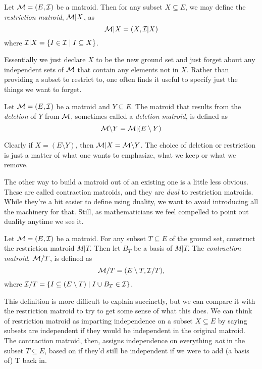 \documentclass[12pt,oneside]{../../sfsuthesis}
\begin{document}
\begin{definition}\th\label{def:restrictionMatroid}
    Let \( \mathcal{M} = (E, \mathcal{I}) \) be a matroid.
    Then for any subset \( X \subseteq E \), we may define the \emph{restriction matroid}, \( \mathcal{M}|X \), as
    \[
        \mathcal{M}|X = ( X, \mathcal{I}|X )
    \]
    where \( \mathcal{I}|X = \{I \in \mathcal{I} \; | \; I \subseteq X\} \).
\end{definition}

Essentially we just declare \( X \) to be the new ground set and just forget about any independent sets of \( \mathcal{M} \) that contain any elements not in \( X \).
Rather than providing a subset to restrict to, one often finds it useful to specify just the things we want to forget.

\begin{definition}\th\label{def:deletionMatroid}
    Let \( \mathcal{M} = (E, \mathcal{I}) \) be a matroid and \( Y \subseteq E \).
    The matroid that results from the \emph{deletion} of \( Y \) from \( \mathcal{M} \), sometimes called a \emph{deletion matroid}, is defined as
    \[
        \mathcal{M} \backslash Y = \mathcal{M}|(E \setminus Y)
    \]
\end{definition}

Clearly if \( X = (E \setminus Y) \), then \( \mathcal{M}|X = \mathcal{M} \backslash Y \).
The choice of deletion or restriction is just a matter of what one wants to emphasize, what we keep or what we remove.

The other way to build a matroid out of an existing one is a little less obvious.
These are called contraction matroids, and they are \emph{dual} to restriction matroids.
While they're a bit easier to define using duality, we want to avoid introducing all the machinery for that.
Still, as mathematicians we feel compelled to point out duality anytime we see it.

\begin{definition}\th\label{def:contractionMatroid}

    Let \( \mathcal{M} = (E, \mathcal{I}) \) be a matroid.
    For any subset \( T \subseteq E \) of the ground set, construct the restriction matroid \( M|T \).
    Then let \( B_T \) be a basis of \( M|T \).
    The \emph{contraction matroid}, \( \mathcal{M}/T \), is defined as
    \[
        \mathcal{M}/T = ( E \setminus T, \mathcal{I}/T ),
    \]
    where \( \mathcal{I}/T = \{ I \subseteq (E \setminus T) \; | \; I \cup B_T \in \mathcal{I} \} \).

\end{definition}

This definition is more difficult to explain succinctly, but we can compare it with the restriction matroid to try to get some sense of what this does.
We can think of  restriction matroid as imparting independence on a subset \( X \subseteq E \) by saying subsets are independent if they would be independent in the original matroid.
The contraction matroid, then, assigns independence on everything \emph{not} in the subset \( T \subseteq E \),  based on if they'd still be independent if we were to add (a basis of) T back in.
\end{document}
